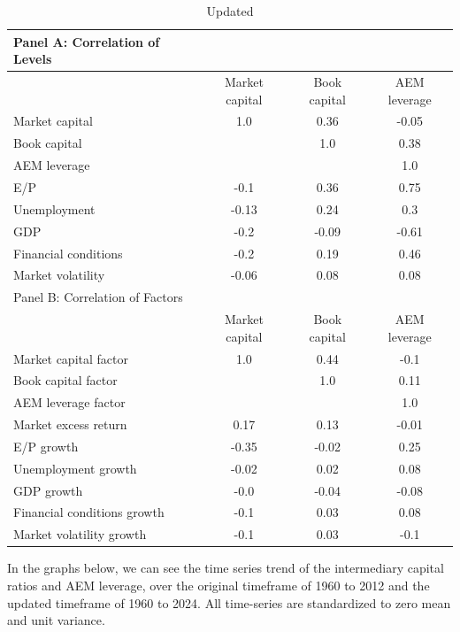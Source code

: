 \documentclass{article}
\begin{document}
    \begin{table}[htbp]
    \centering
    \caption{\label{tab:correlation}Updated}
    \begin{adjustbox}{max width=\textwidth}
    \small
    \begin{tabular}{lccc}
        \toprule
        Panel A: Correlation of Levels \\
        \midrule
         & Market capital & Book capital & AEM leverage \\
        \midrule
        Market capital & 1.0 & 0.36 & -0.05 \\
Book capital &  & 1.0 & 0.38 \\
AEM leverage &  &  & 1.0 \\
E/P & -0.1 & 0.36 & 0.75 \\
Unemployment & -0.13 & 0.24 & 0.3 \\
GDP & -0.2 & -0.09 & -0.61 \\
Financial conditions & -0.2 & 0.19 & 0.46 \\
Market volatility & -0.06 & 0.08 & 0.08 \\
        \midrule
        Panel B: Correlation of Factors \\
        \midrule
         & Market capital & Book capital & AEM leverage \\
        \midrule
        Market capital factor & 1.0 & 0.44 & -0.1 \\
Book capital factor &  & 1.0 & 0.11 \\
AEM leverage factor &  &  & 1.0 \\
Market excess return & 0.17 & 0.13 & -0.01 \\
E/P growth & -0.35 & -0.02 & 0.25 \\
Unemployment growth & -0.02 & 0.02 & 0.08 \\
GDP growth & -0.0 & -0.04 & -0.08 \\
Financial conditions growth & -0.1 & 0.03 & 0.08 \\
Market volatility growth & -0.1 & 0.03 & -0.1 \\
        \bottomrule
    \end{tabular}
    \end{adjustbox}
    \end{table}
    
\clearpage

In the graphs below, we can see the time series trend of the intermediary capital ratios and AEM leverage, over the original timeframe of 1960 to 2012 and the updated timeframe of 1960 to 2024. All time-series are standardized to zero mean and unit variance.
\end{document}
